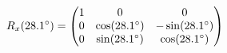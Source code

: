 \documentclass[preview]{standalone}
\begin{document}
\begin{align*}
\special{dvisvgm:raw <g id='unique000'>}R_x(28.1^\circ) = \begin{pmatrix} 1 & 0 & 0 \\ 0 & \cos(28.1^\circ) & -\sin(28.1^\circ) \\ 0 & \sin(28.1^\circ) & \cos(28.1^\circ) \end{pmatrix}\special{dvisvgm:raw </g>}
\end{align*}
\end{document}
